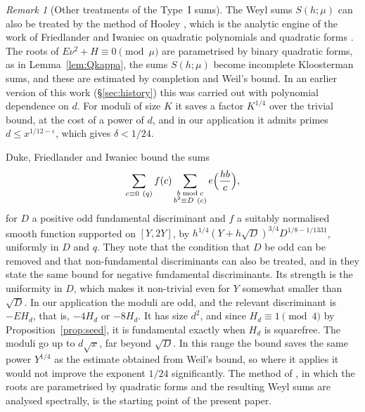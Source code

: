 \documentclass[11pt]{amsart}
\theoremstyle{remark}
\newtheorem{remark}[theorem]{Remark}
\theoremstyle{definition}
\numberwithin{equation}{section}
\newcommand{\eps}{\varepsilon}
\begin{document}
\begin{remark}[Other treatments of the Type~I sums]\label{rem:DFI}
The Weyl sums $S(h;\mu)$ can also be treated by the method of Hooley \cite{Ho63}, which is the analytic engine of the work of Friedlander and Iwaniec on quadratic polynomials and quadratic forms \cite{FI78}. The roots of $E\nu^2+H\equiv0\pmod\mu$ are parametrised by binary quadratic forms, as in Lemma~\ref{lem:Qkappa}, the sums $S(h;\mu)$ become incomplete Kloosterman sums, and these are estimated by completion and Weil's bound. In an earlier version of this work (\S\ref{sec:history}) this was carried out with polynomial dependence on $d$. For moduli of size $K$ it saves a factor $K^{1/4}$ over the trivial bound, at the cost of a power of $d$, and in our application it admits primes $d\le x^{1/12-\eps}$, which gives $\delta<1/24$.

Duke, Friedlander and Iwaniec \cite[Theorem~1.1]{DFI12} bound the sums
\[
\sum_{c\equiv0\ (q)}f(c)\sum_{\substack{b\bmod c\\ b^2\equiv D\ (c)}}e\Bigl(\frac{hb}c\Bigr),
\]
for $D$ a positive odd fundamental discriminant and $f$ a suitably normalised smooth function supported on $[Y,2Y]$, by $h^{1/4}(Y+h\sqrt D)^{3/4}D^{1/8-1/1331}$, uniformly in $D$ and $q$. They note that the condition that $D$ be odd can be removed and that non-fundamental discriminants can also be treated, and in \cite[\S16]{DFI12} they state the same bound for negative fundamental discriminants. Its strength is the uniformity in $D$, which makes it non-trivial even for $Y$ somewhat smaller than $\sqrt D$. In our application the moduli are odd, and the relevant discriminant is $-EH_d$, that is, $-4H_d$ or $-8H_d$. It has size $d^2$, and since $H_d\equiv1\pmod 4$ by Proposition~\ref{prop:seed}, it is fundamental exactly when $H_d$ is squarefree. The moduli go up to $d\sqrt x$, far beyond $\sqrt D$. In this range the bound saves the same power $Y^{1/4}$ as the estimate obtained from Weil's bound, so where it applies it would not improve the exponent $1/24$ significantly. The method of \cite{DFI95,DFI12}, in which the roots are parametrised by quadratic forms and the resulting Weyl sums are analysed spectrally, is the starting point of the present paper.
\end{remark}
\end{document}
